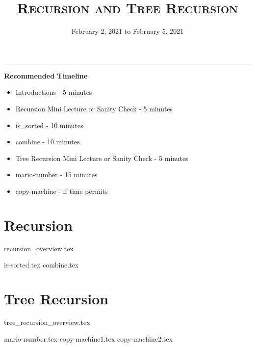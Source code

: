\documentclass{exam}
\title{\textsc{Recursion and Tree Recursion}}
\date{February 2, 2021 to February 5, 2021}
\begin{document}
\maketitle
\rule{\textwidth}{0.15em}
\fontsize{12}{15}\selectfont

\begin{guide}
\textbf{Recommended Timeline}
\begin{itemize}
    \item Introductions - 5 minutes
    \item Recursion Mini Lecture or Sanity Check - 5 minutes
    \item is\_sorted - 10 minutes
    \item combine - 10 minutes
    \item Tree Recursion Mini Lecture or Sanity Check - 5 minutes
    \item mario-number - 15 minutes
    \item copy-machine - if time permits
\end{itemize}
\end{guide}

\section{Recursion}
{recursion_overview.tex}
\begin{questions}
{is-sorted.tex}
{combine.tex}
\end{questions}

\pagebreak

\section{Tree Recursion}
{tree_recursion_overview.tex}
\pagebreak
\begin{questions}
{mario-number.tex}
{copy-machine1.tex}
{copy-machine2.tex}
\end{questions}
\end{document}
